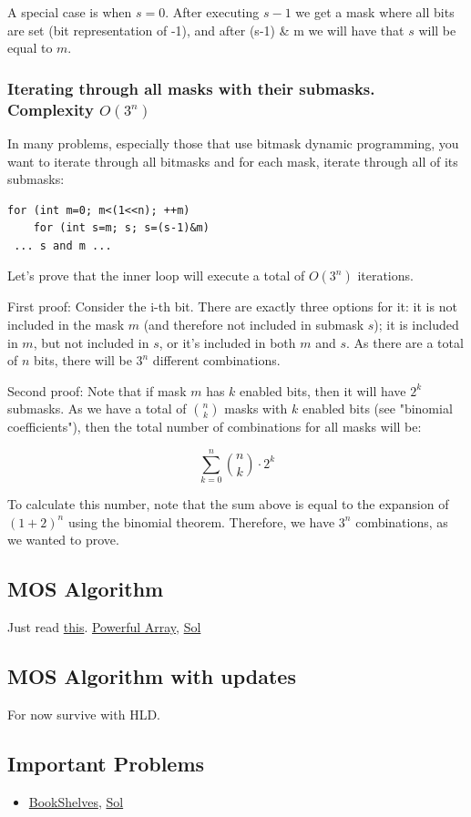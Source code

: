 \documentclass[8pt, a4paper, oneside, twocolumn]{extarticle}
\begin{document}
A special case is when $s = 0$. After executing $s-1$ we get a mask where all bits are set (bit representation of -1), and after (s-1) \& m we will have that $s$ will be equal to $m$. 
\subsubsection{Iterating through all masks with their submasks. Complexity $O(3^n)$}

In many problems, especially those that use bitmask dynamic programming, you want to iterate through all bitmasks and for each mask, iterate through all of its submasks:
\begin{verbatim}
for (int m=0; m<(1<<n); ++m)
	for (int s=m; s; s=(s-1)&m)
 ... s and m ...
\end{verbatim}
Let's prove that the inner loop will execute a total of $O(3^n)$ iterations.

First proof: Consider the i-th bit. There are exactly three options for it: it is not included in the mask $m$ (and therefore not included in submask $s$); it is included in $m$, but not included in $s$, or it's included in both $m$ and $s$. As there are a total of $n$ bits, there will be $3^n$ different combinations.

Second proof: Note that if mask $m$ has $k$ enabled bits, then it will have $2^k$ submasks. As we have a total of $\binom{n}{k}$ masks with $k$ enabled bits (see "binomial coefficients"), then the total number of combinations for all masks will be:

$$\sum_{k=0}^n \binom{n}{k} \cdot 2^k$$

To calculate this number, note that the sum above is equal to the expansion of $(1+2)^n$ using the binomial theorem. Therefore, we have $3^n$ combinations, as we wanted to prove.
\subsection{MOS Algorithm}
Just read \href{https://blog.anudeep2011.com/mos-algorithm/}{this}. \href{https://codeforces.com/contest/86/problem/D}{Powerful Array}, \href{https://codeforces.com/contest/86/submission/39212866}{Sol}
\subsection{MOS Algorithm with updates}
For now survive with HLD.
\subsection{Important Problems}
\begin{itemize}
    \item \href{https://codeforces.com/contest/981/problem/D}{BookShelves}, \href{https://codeforces.com/contest/981/submission/38660572}{Sol}
\end{itemize}
\end{document}
